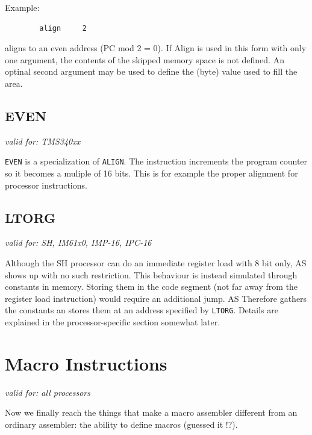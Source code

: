\documentclass[12pt,twoside]{report}
\makeatletter
\newcommand{\tty}[1]{{\tt #1}}
\newcommand{\ttindex}[1]{\index{#1@{\tt #1}}}
\newcommand{\asname}{{AS}}
\makeatother
\begin{document}
Example:
\begin{verbatim}
        align     2
\end{verbatim}
aligns to an even address (PC mod 2 = 0).  If Align is used in this form with
only one argument, the contents of the skipped memory space is not defined. 
An optinal second argument may be used to define the (byte) value
used to fill the area.

 
\subsection{EVEN}
\ttindex{EVEN}
 
{\em valid for: TMS340xx}

\tty{EVEN} is a specialization of \tty{ALIGN}. The instruction increments the
program counter so it becomes a muliple of 16 bits.  This is for example the
proper alignment for processor instructions.
 

\subsection{LTORG}
\ttindex{LTORG}

{\em valid for: SH, IM61x0, IMP-16, IPC-16}

Although the SH processor can do an immediate register load with
8 bit only, \asname{} shows up with no such restriction.  This behaviour is
instead simulated through constants in memory.  Storing them in
the code segment (not far away from the register load instruction)
would require an additional jump.  \asname{} Therefore gathers the constants
an stores them at an address specified by \tty{LTORG}.  Details are
explained in the processor-specific section somewhat later.


\section{Macro Instructions}

{\em valid for: all processors}

Now we finally reach the things that make a macro assembler different
from an ordinary assembler: the ability to define macros (guessed
it !?).
\end{document}

